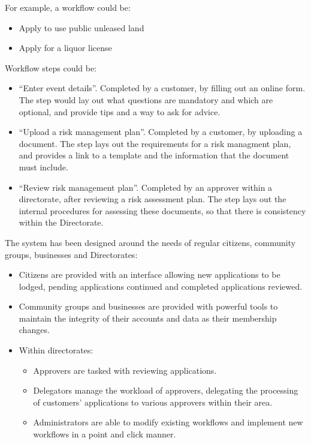 \documentclass[12pt,a4paper,twosided]{article}
\begin{document}
\begin{framed}
For example, a workflow could be:

\begin{itemize}

\item
  Apply to use public unleased land
\item
  Apply for a liquor license
\end{itemize}

Workflow steps could be:

\begin{itemize}

\item
  ``Enter event details''. Completed by a customer, by filling out an
  online form. The step would lay out what questions are mandatory and
  which are optional, and provide tips and a way to ask for advice.
\item
  ``Upload a risk management plan''. Completed by a customer, by
  uploading a document. The step lays out the requirements for a risk
  managment plan, and provides a link to a template and the information
  that the document must include.
\item
  ``Review risk management plan''. Completed by an approver within a
  directorate, after reviewing a risk assessment plan. The step lays out
  the internal procedures for assessing these documents, so that there
  is consistency within the Directorate.
\end{itemize}
\end{framed}

The system has been designed around the needs of regular citizens,
community groups, businesses and Directorates:

\begin{itemize}

\item
  Citizens are provided with an interface allowing new applications to
  be lodged, pending applications continued and completed applications
  reviewed.
\item
  Community groups and businesses are provided with powerful tools to
  maintain the integrity of their accounts and data as their membership
  changes.
\item
  Within directorates:
\begin{itemize}
\item
  Approvers are tasked with reviewing applications.
\item
  Delegators manage the workload of approvers, delegating the processing
  of customers' applications to various approvers within their area.
\item
  Administrators are able to modify existing workflows and implement new
  workflows in a point and click manner.
\end{itemize}
\end{itemize}
\end{document}
